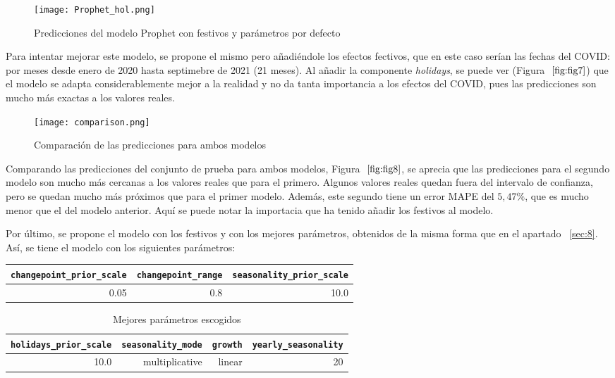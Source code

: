\documentclass[12pt,twoside]{article}
\begin{document}
\begin{figure}[h]
    \centering
    \texttt{[image: Prophet\_hol.png]}
    \caption{Predicciones del modelo Prophet con festivos y parámetros por defecto} 
    \label{fig:fig7}
\end{figure}

Para intentar mejorar este modelo, se propone el mismo pero añadiéndole los efectos fectivos, que en este caso serían las fechas del COVID: por meses desde enero de 2020 hasta septimebre de 2021 (21 meses). Al añadir la componente \textit{holidays}, se puede ver (Figura $~\ref{fig:fig7}$) que el modelo se adapta considerablemente mejor a la realidad y no da tanta importancia a los efectos del COVID, pues las predicciones son mucho más exactas a los valores reales.

\begin{figure}[h]
    \centering
    \texttt{[image: comparison.png]}
    \caption{Comparación de las predicciones para ambos modelos} 
    \label{fig:fig8}
\end{figure}

Comparando las predicciones del conjunto de prueba para ambos modelos, Figura $~\ref{fig:fig8}$, se aprecia que las predicciones para el segundo modelo son mucho más cercanas a los valores reales que para el primero. Algunos valores reales quedan fuera del intervalo de confianza, pero se quedan mucho más próximos que para el primer modelo. Además, este segundo tiene un error MAPE del $5,47\%$, que es mucho menor que el del modelo anterior. Aquí se puede notar la importacia que ha tenido añadir los festivos al modelo. 

Por último, se propone el modelo con los festivos y con los mejores parámetros, obtenidos de la misma forma que en el apartado ~\ref{sec:8}. Así, se tiene el modelo con los siguientes parámetros: 

\begin{table}[ht] 
\centering
\begin{tabular}{rrr} 
  \hline
 \texttt{changepoint\_prior\_scale} & \texttt{changepoint\_range} & \texttt{seasonality\_prior\_scale} \\ 
  \hline
0.05 & 0.8 & 10.0 \\ 
   \hline
\end{tabular}
\end{table}

\begin{table}[ht] 
\centering
\begin{tabular}{rrrr} 
  \hline
 \texttt{holidays\_prior\_scale} & \texttt{seasonality\_mode} & \texttt{growth} & \texttt{yearly\_seasonality} \\ 
  \hline
10.0 & multiplicative & linear & 20 \\ 
   \hline
\end{tabular}
\caption{Mejores parámetros escogidos} \label{tab:01}
\end{table}
\end{document}

